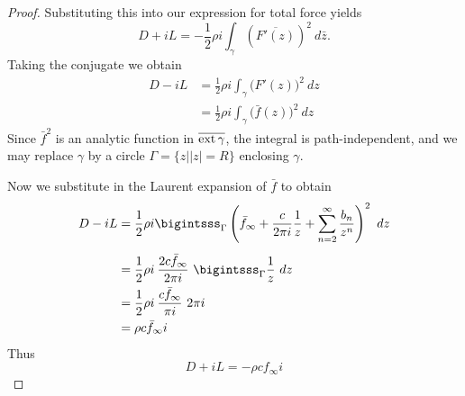 \documentclass[letterpaper, twoside, 12 pt]{article}
\begin{document}
\begin{proof}
		
		Substituting this into our expression for total force yields
		\[
			D + iL = - \frac{1}{2} \rho i \int_\gamma \left( \overline{F'(z)} \right)^2 \ d \bar z.
		\]
		Taking the conjugate we obtain
		\begin{align*}
			D - iL &= \frac{1}{2} \rho i \int_\gamma \big( F'(z) \big)^2 \ dz \\
			&= \frac{1}{2} \rho i \int_\gamma \big( \bar f(z) \big)^2 \ dz  
		\end{align*}
		Since $\bar f^2$ is an analytic function in $\overline{\operatorname*{ext} \gamma}$, the integral is path-independent, and we may replace $\gamma$ by a circle $\Gamma = \{ z \bm{\mid} |z| = R \}$ enclosing $\gamma$.

		Now we substitute in the Laurent expansion of $\bar f$ to obtain
		\begin{align*}
			D - iL &= \frac{1}{2} \rho i \bigintsss_\Gamma \left( \bar f_\infty + \frac{c}{2 \pi i} \frac{1}{z} + \sum_{n=2}^\infty \frac{b_n}{z^n} \right)^2 \ dz \\[1 ex]
			&= \frac{1}{2} \rho i \> \frac{2 c \bar f_\infty}{2 \pi i} \ \bigintsss_\Gamma \frac{1}{z} \ dz \\
			&= \frac{1}{2} \rho i \> \frac{c \bar f_\infty}{\pi i} \ 2 \pi i \\
			&= \rho c \bar f_\infty i
		\end{align*}
		Thus
		\[
			D + iL = - \rho c f_\infty i
		\]
	\end{proof}


\clearpage
\nocite{*}


\end{document}
